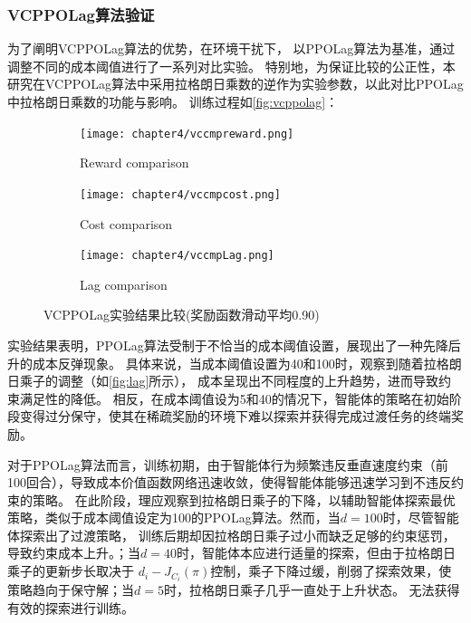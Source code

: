 \subsubsection{VCPPOLag算法验证}
为了阐明VCPPOLag算法的优势，在环境干扰下，
以PPOLag算法为基准，通过调整不同的成本阈值进行了一系列对比实验。
特别地，为保证比较的公正性，本研究在VCPPOLag算法中采用拉格朗日乘数的逆作为实验参数，以此对比PPOLag中拉格朗日乘数的功能与影响。
训练过程如\autoref{fig:vcppolag}：
\begin{figure}[H]
    \centering
    \begin{subfigure}{.5\textwidth}
        \centering
        \texttt{[image: chapter4/vccmpreward.png]}
        \caption{Reward comparison}
        \label{fig:reward}
    \end{subfigure}%

    \begin{subfigure}{.5\textwidth}
        \centering
        \texttt{[image: chapter4/vccmpcost.png]}
        \caption{Cost comparison}
        \label{fig:cost}
    \end{subfigure}

    \begin{subfigure}{.5\textwidth}
        \centering
        \texttt{[image: chapter4/vccmpLag.png]}
        \caption{Lag comparison}
        \label{fig:lag}
    \end{subfigure}
    \caption{VCPPOLag实验结果比较(奖励函数滑动平均0.90)}
    \label{fig:vcppolag}
\end{figure}
实验结果表明，PPOLag算法受制于不恰当的成本阈值设置，展现出了一种先降后升的成本反弹现象。
具体来说，当成本阈值设置为40和100时，观察到随着拉格朗日乘子的调整（如\autoref{fig:lag}所示），
成本呈现出不同程度的上升趋势，进而导致约束满足性的降低。
相反，在成本阈值设为5和40的情况下，智能体的策略在初始阶段变得过分保守，使其在稀疏奖励的环境下难以探索并获得完成过渡任务的终端奖励。

对于PPOLag算法而言，训练初期，由于智能体行为频繁违反垂直速度约束（前100回合），导致成本价值函数网络迅速收敛，使得智能体能够迅速学习到不违反约束的策略。
在此阶段，理应观察到拉格朗日乘子的下降，以辅助智能体探索最优策略，类似于成本阈值设定为100的PPOLag算法。然而，当$d=100$时，尽管智能体探索出了过渡策略，
训练后期却因拉格朗日乘子过小而缺乏足够的约束惩罚，导致约束成本上升。；当$d=40$时，智能体本应进行适量的探索，但由于拉格朗日乘子的更新步长取决于
$d_{i}-J_{C_{i}}(\pi)$控制，乘子下降过缓，削弱了探索效果，使策略趋向于保守解；当$d=5$时，拉格朗日乘子几乎一直处于上升状态。
无法获得有效的探索进行训练。

